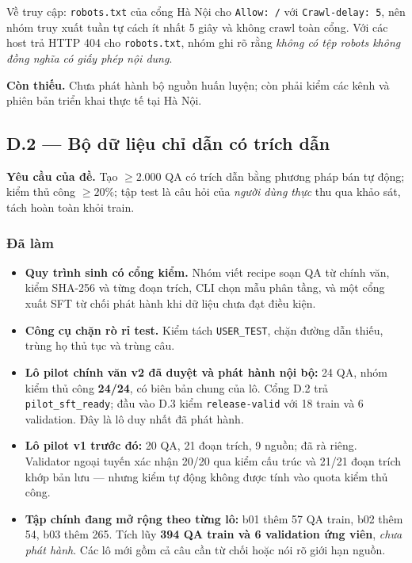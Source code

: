Về truy cập: \texttt{robots.txt} của cổng Hà Nội cho \texttt{Allow: /} với
\texttt{Crawl-delay: 5}, nên nhóm truy xuất tuần tự cách ít nhất 5 giây và không
crawl toàn cổng. Với các host trả HTTP 404 cho \texttt{robots.txt}, nhóm ghi rõ
rằng \emph{không có tệp robots không đồng nghĩa có giấy phép nội dung}.

\textbf{Còn thiếu.} Chưa phát hành bộ nguồn huấn luyện; còn phải kiểm các kênh và
phiên bản triển khai thực tế tại Hà Nội.

\subsection{D.2 --- Bộ dữ liệu chỉ dẫn có trích dẫn}
\label{sec:d2}

\textbf{Yêu cầu của đề.} Tạo $\ge 2.000$ QA có trích dẫn bằng phương pháp bán tự
động; kiểm thủ công $\ge20\%$; tập test là câu hỏi của \emph{người dùng thực} thu
qua khảo sát, tách hoàn toàn khỏi train.

\subsubsection{Đã làm \motphan}

\begin{itemize}[leftmargin=2em]
\item \textbf{Quy trình sinh có cổng kiểm.} Nhóm viết recipe soạn QA từ chính văn,
kiểm SHA-256 và từng đoạn trích, CLI chọn mẫu phân tầng, và một cổng xuất SFT từ
chối phát hành khi dữ liệu chưa đạt điều kiện.
\item \textbf{Công cụ chặn rò rỉ test.} Kiểm tách \texttt{USER\_TEST}, chặn đường
dẫn thiếu, trùng họ thủ tục và trùng câu.
\item \textbf{Lô pilot chính văn v2 đã duyệt và phát hành nội bộ:} 24 QA, nhóm
kiểm thủ công \textbf{24/24}, có biên bản chung của lô. Cổng D.2 trả
\texttt{pilot\_sft\_ready}; đầu vào D.3 kiểm \texttt{release-valid} với 18 train
và 6 validation. Đây là lô duy nhất đã phát hành.
\item \textbf{Lô pilot v1 trước đó:} 20 QA, 21 đoạn trích, 9 nguồn; đã rà riêng.
Validator ngoại tuyến xác nhận 20/20 qua kiểm cấu trúc và 21/21 đoạn trích khớp
bản lưu --- nhưng kiểm tự động không được tính vào quota kiểm thủ công.
\item \textbf{Tập chính đang mở rộng theo từng lô:} b01 thêm 57 QA train, b02
thêm 54, b03 thêm 265. Tích lũy \textbf{394 QA train và 6 validation ứng viên},
\emph{chưa phát hành}. Các lô mới gồm cả câu cần từ chối hoặc nói rõ giới hạn
nguồn.
\end{itemize}

